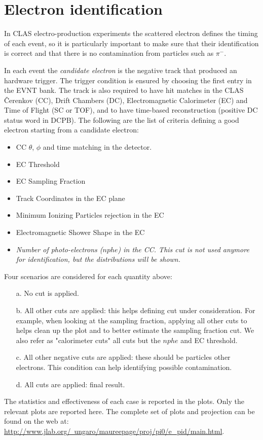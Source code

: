 \clearpage\newpage
\section{Electron identification}

In CLAS electro-production experiments
the scattered electron defines the timing of each event,
so it is particularly important to
make sure that their identification is correct and that
there is no contamination from particles such as $\pi^-$.

In each event the {\it candidate electron} is the negative track
that produced an hardware trigger. The trigger condition is ensured by choosing
the first entry in the EVNT bank. The track is also required to have
hit matches in the CLAS \v Cerenkov (CC), Drift Chambers (DC),
Electromagnetic Calorimeter (EC) and Time of Flight (SC or TOF),
and to have time-based reconstruction (positive DC status word in DCPB).
The following are the list of criteria defining a good electron
starting from a candidate electron:

\begin{itemize}
	\item CC $\theta$, $\phi$ and time matching in the  detector.
	\item EC Threshold 
	\item EC Sampling Fraction 
	\item Track Coordinates in the EC plane 
	\item Minimum Ionizing Particles rejection in the EC
	\item Electromagnetic Shower Shape in the EC
	\item {\it Number of photo-electrons ($nphe$) in the CC.
              This cut is not used anymore for identification,
              but the distributions will be shown. }
\end{itemize}

Four scenarios are considered for each quantity above:

\begin{itemize}  
	\item[a.] No cut is applied.
	\item[b.] All other cuts are applied: this helps defining cut under consideration.
	      For example, when looking at the sampling fraction, applying all other
	      cuts to helps clean up the plot and to better estimate the sampling fraction
	      cut. We also refer as "calorimeter cuts" all cuts but the $nphe$ and EC threshold.
	\item[c.] All other negative cuts are applied: these should be particles other electrons. This
	      condition can help identifying possible contamination.
	\item[d.] All cuts are applied: final result.
\end{itemize}
The statistics and effectiveness of each case is reported in the plots.
Only the relevant plots are reported here. The complete set of plots and projection can
be found on the web at: \href{http://www.jlab.org/~ungaro/maureepage/proj/pi0/e_pid/main.html}
{http://www.jlab.org/~ungaro/maureepage/proj/pi0/e\_pid/main.html}.

